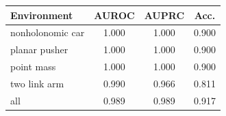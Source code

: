 \begin{tabular}{lccc}\toprule
Environment & AUROC & AUPRC & Acc.\\\midrule
nonholonomic car & 1.000 & 1.000 & 0.900\\
planar pusher & 1.000 & 1.000 & 0.900\\
point mass & 1.000 & 1.000 & 0.900\\
two link arm & 0.990 & 0.966 & 0.811\\
all & 0.989 & 0.989 & 0.917\\
\bottomrule\end{tabular}
